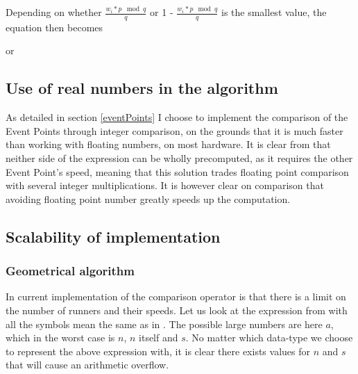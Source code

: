 
Depending on whether $\frac{w_i * p \mod q}{q}$ or 1 - $\frac{w_i * p \mod q}{q}$ is the smallest value, the equation then becomes


or 


\subsection{Use of real numbers in the algorithm}
As detailed in section \ref{eventPoints} I choose to implement the comparison of the Event Points through integer comparison, on the grounds that it is much faster than working with floating numbers, on most hardware. It is clear from  that neither side of the expression can be wholly precomputed, as it requires the other Event Point's speed, meaning that this solution trades floating point comparison with several integer multiplications. It is however clear on comparison that avoiding floating point number greatly speeds up the computation.

\subsection{Scalability of implementation}
\label{scale}

\subsubsection{Geometrical algorithm}
In current implementation of the comparison operator is that there is a limit on the number of runners and their speeds. Let us look at the expression 
 from  with all the symbols mean the same as in . The possible large numbers are here $a$, which in the worst case is $n$, $n$ itself and $s$. No matter which data-type we choose to represent the above expression with, it is clear there exists values for $n$ and $s$ that will cause an arithmetic overflow.

